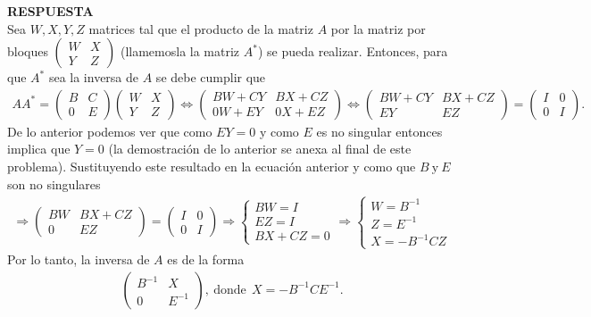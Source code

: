 \documentclass[11pt,letterpaper]{article}
\newcommand{\res}{\textbf{RESPUESTA}\\}
\begin{document}
\begin{enumerate}
\res
Sea $W,X,Y,Z$ matrices tal que el producto de la matriz $A$ por la matriz por bloques $
\begin{pmatrix}
W & X\\
Y & Z
\end{pmatrix}
$ (llamemosla la matriz $A^*$) se pueda realizar. Entonces, para que $A^*$ sea la inversa de $A$ se debe cumplir que 
\begin{align*}
AA^{*}=\begin{pmatrix}
B & C \\
0 & E
\end{pmatrix}\begin{pmatrix}
W & X\\
Y & Z
\end{pmatrix}\Leftrightarrow \begin{pmatrix}
BW+CY & BX+CZ\\
0W+EY & 0X+EZ
\end{pmatrix}\Leftrightarrow \begin{pmatrix}
BW+CY & BX+CZ\\
EY & EZ
\end{pmatrix}=\begin{pmatrix}
I&0\\
0&I
\end{pmatrix}.
\end{align*}
De lo anterior podemos ver que como $EY=0$ y como $E$ es no singular entonces implica que $Y=0$ (la demostración de lo anterior se anexa al final de este problema). Sustituyendo este resultado en la ecuación anterior y como que $B\ \text{y} \ E$ son no singulares
\begin{align*}
\Rightarrow \begin{pmatrix}
BW & BX+CZ\\
0 & EZ
\end{pmatrix}=\begin{pmatrix}
I&0\\
0&I
\end{pmatrix}\Rightarrow\left\{\begin{array}{c}
BW=I\\
EZ=I\\
BX+CZ=0
\end{array} \right. \Rightarrow 
\left\{\begin{array}{c}
W=B^{-1}\\
Z=E^{-1}\\
X=-B^{-1}CZ
\end{array} \right.
\end{align*}
Por lo tanto, la inversa de $A$ es de la forma
\begin{align*}
\begin{pmatrix}
B^{-1} & X\\
0& E^{-1}
\end{pmatrix}, \ \text{donde}\ \  X=-B^{-1}CE^{-1}.
\end{align*}


\end{enumerate}
\end{document}
